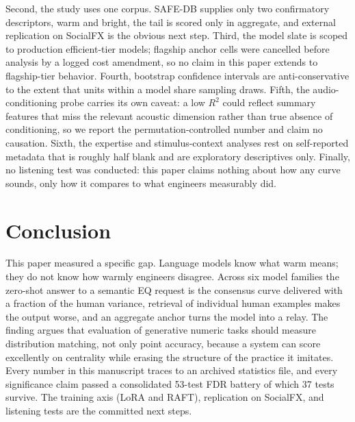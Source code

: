 \documentclass[11pt]{article}
\begin{document}
Second, the study uses one corpus. SAFE-DB supplies only two confirmatory descriptors, warm and bright, the tail is scored only in aggregate, and external replication on SocialFX is the obvious next step. Third, the model slate is scoped to production efficient-tier models; flagship anchor cells were cancelled before analysis by a logged cost amendment, so no claim in this paper extends to flagship-tier behavior. Fourth, bootstrap confidence intervals are anti-conservative to the extent that units within a model share sampling draws. Fifth, the audio-conditioning probe carries its own caveat: a low $R^2$ could reflect summary features that miss the relevant acoustic dimension rather than true absence of conditioning, so we report the permutation-controlled number and claim no causation. Sixth, the expertise and stimulus-context analyses rest on self-reported metadata that is roughly half blank and are exploratory descriptives only. Finally, no listening test was conducted: this paper claims nothing about how any curve sounds, only how it compares to what engineers measurably did.

\section{Conclusion}

This paper measured a specific gap. Language models know what warm means; they do not know how warmly engineers disagree. Across six model families the zero-shot answer to a semantic EQ request is the consensus curve delivered with a fraction of the human variance, retrieval of individual human examples makes the output worse, and an aggregate anchor turns the model into a relay. The finding argues that evaluation of generative numeric tasks should measure distribution matching, not only point accuracy, because a system can score excellently on centrality while erasing the structure of the practice it imitates. Every number in this manuscript traces to an archived statistics file, and every significance claim passed a consolidated 53-test FDR battery of which 37 tests survive. The training axis (LoRA and RAFT), replication on SocialFX, and listening tests are the committed next steps.
\end{document}
